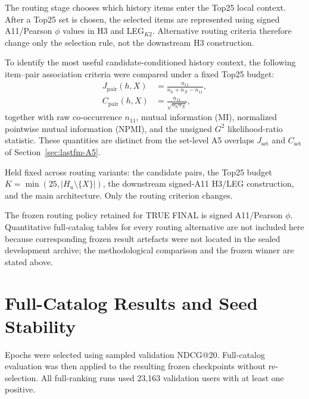 The routing stage chooses which history items enter the Top25 local context.
After a Top25 set is chosen, the selected items are represented using signed A11/Pearson $\phi$ values in H3 and LEG$_{K2}$.
Alternative routing criteria therefore change only the selection rule, not the downstream H3 construction.

To identify the most useful candidate-conditioned history context, the following item--pair association criteria were compared under a fixed Top25 budget:
\begin{align}
J_{\mathrm{pair}}(h,X)
&=
\frac{n_{11}}{n_h+n_X-n_{11}},
\label{eq:lastfm-Jpair}\\
C_{\mathrm{pair}}(h,X)
&=
\frac{n_{11}}{\sqrt{n_h n_X}},
\label{eq:lastfm-Cpair}
\end{align}
together with raw co-occurrence $n_{11}$, mutual information (MI), normalized pointwise mutual information (NPMI), and the unsigned $G^{2}$ likelihood-ratio statistic.
These quantities are distinct from the set-level A5 overlaps $J_{\mathrm{set}}$ and $C_{\mathrm{set}}$ of Section~\ref{sec:lastfm-A5}.

Held fixed across routing variants:
the candidate pairs, the Top25 budget $K=\min(25,|H_u\setminus\{X\}|)$, the downstream signed-A11 H3/LEG construction, and the main architecture.
Only the routing criterion changes.

The frozen routing policy retained for TRUE FINAL is signed A11/Pearson $\phi$.
Quantitative full-catalog tables for every routing alternative are not included here because corresponding frozen result artefacts were not located in the sealed development archive; the methodological comparison and the frozen winner are stated above.

\section{Full-Catalog Results and Seed Stability}
\label{sec:lastfm-fullrank}

Epochs were selected using sampled validation NDCG@20.
Full-catalog evaluation was then applied to the resulting frozen checkpoints without re-selection.
All full-ranking runs used 23{,}163 validation users with at least one positive.

